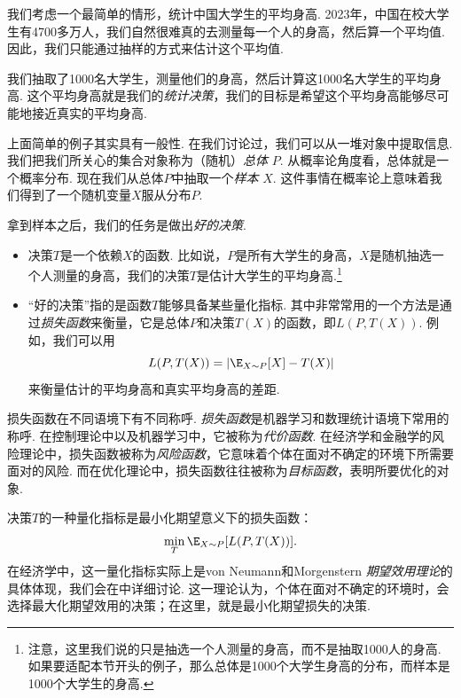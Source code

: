 我们考虑一个最简单的情形，统计中国大学生的平均身高. 2023年，中国在校大学生有4700多万人，我们自然很难真的去测量每一个人的身高，然后算一个平均值. 因此，我们只能通过抽样的方式来估计这个平均值. 

我们抽取了1000名大学生，测量他们的身高，然后计算这1000名大学生的平均身高. 这个平均身高就是我们的\emph{统计决策}，我们的目标是希望这个平均身高能够尽可能地接近真实的平均身高. 

上面简单的例子其实具有一般性. 在我们讨论过，我们可以从一堆对象中提取信息. 我们把我们所关心的集合对象称为（随机）\emph{总体} $P$. 从概率论角度看，总体就是一个概率分布. 现在我们从总体$P$中抽取一个\emph{样本} $X$. 这件事情在概率论上意味着我们得到了一个随机变量$X$服从分布$P$. 

拿到样本之后，我们的任务是做出\emph{好的决策}.
\begin{itemize}
    \item 决策$T$是一个依赖$X$的函数. 比如说，$P$是所有大学生的身高，$X$是随机抽选一个人测量的身高，我们的决策$T$是估计大学生的平均身高.\footnote{注意，这里我们说的只是抽选一个人测量的身高，而不是抽取1000人的身高. 如果要适配本节开头的例子，那么总体是1000个大学生身高的分布，而样本是1000个大学生的身高. }
    \item “好的决策”指的是函数$T$能够具备某些量化指标. 其中非常常用的一个方法是通过\emph{损失函数}来衡量，它是总体$P$和决策$T(X)$的函数，即$L(P,T(X))$. 例如，我们可以用
    \[L(P,T(X))=|\E_{X\sim P}[X]-T(X)|\]
    来衡量估计的平均身高和真实平均身高的差距.
\end{itemize}

\begin{remark}
    损失函数在不同语境下有不同称呼. \emph{损失函数}是机器学习和数理统计语境下常用的称呼. 在控制理论中以及机器学习中，它被称为\emph{代价函数}. 在经济学和金融学的风险理论中，损失函数被称为\emph{风险函数}，它意味着个体在面对不确定的环境下所需要面对的风险. 而在优化理论中，损失函数往往被称为\emph{目标函数}，表明所要优化的对象. 
\end{remark}

决策$T$的一种量化指标是最小化期望意义下的损失函数：
    \[\min_{T}\E_{X\sim P}[L(P,T(X))].\]
在经济学中，这一量化指标实际上是von Neumann和Morgenstern \emph{期望效用理论}的具体体现，我们会在中详细讨论. 这一理论认为，个体在面对不确定的环境时，会选择最大化期望效用的决策；在这里，就是最小化期望损失的决策.

